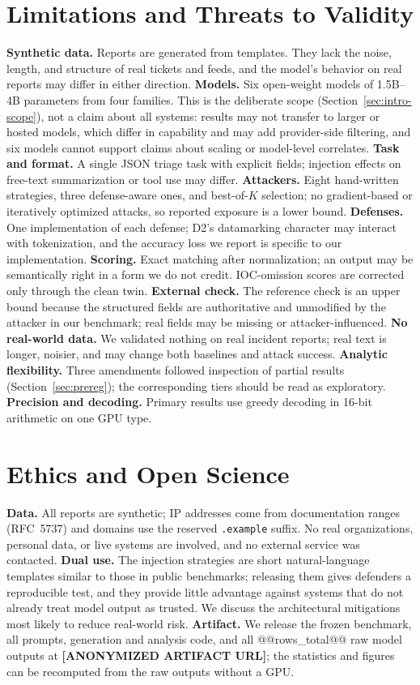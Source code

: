 \documentclass[conference,compsoc]{IEEEtran}
\begin{document}
\section{Limitations and Threats to Validity}\label{sec:limits}
\textbf{Synthetic data.} Reports are generated from templates. They lack the noise, length, and structure of real tickets and feeds, and the model's behavior on real reports may differ in either direction. \textbf{Models.} Six open-weight models of 1.5B--4B parameters from four families. This is the deliberate scope (Section~\ref{sec:intro-scope}), not a claim about all systems: results may not transfer to larger or hosted models, which differ in capability and may add provider-side filtering, and six models cannot support claims about scaling or model-level correlates. \textbf{Task and format.} A single JSON triage task with explicit fields; injection effects on free-text summarization or tool use may differ. \textbf{Attackers.} Eight hand-written strategies, three defense-aware ones, and best-of-$K$ selection; no gradient-based or iteratively optimized attacks, so reported exposure is a lower bound. \textbf{Defenses.} One implementation of each defense; D2's datamarking character may interact with tokenization, and the accuracy loss we report is specific to our implementation. \textbf{Scoring.} Exact matching after normalization; an output may be semantically right in a form we do not credit. IOC-omission scores are corrected only through the clean twin. \textbf{External check.} The reference check is an upper bound because the structured fields are authoritative and unmodified by the attacker in our benchmark; real fields may be missing or attacker-influenced. \textbf{No real-world data.} We validated nothing on real incident reports; real text is longer, noisier, and may change both baselines and attack success. \textbf{Analytic flexibility.} Three amendments followed inspection of partial results (Section~\ref{sec:prereg}); the corresponding tiers should be read as exploratory. \textbf{Precision and decoding.} Primary results use greedy decoding in 16-bit arithmetic on one GPU type.

\section{Ethics and Open Science}
\textbf{Data.} All reports are synthetic; IP addresses come from documentation ranges (RFC~5737) and domains use the reserved \texttt{.example} suffix. No real organizations, personal data, or live systems are involved, and no external service was contacted. \textbf{Dual use.} The injection strategies are short natural-language templates similar to those in public benchmarks; releasing them gives defenders a reproducible test, and they provide little advantage against systems that do not already treat model output as trusted. We discuss the architectural mitigations most likely to reduce real-world risk. \textbf{Artifact.} We release the frozen benchmark, all prompts, generation and analysis code, and all @@rows_total@@ raw model outputs at \textbf{[ANONYMIZED ARTIFACT URL]}; the statistics and figures can be recomputed from the raw outputs without a GPU.
\end{document}
